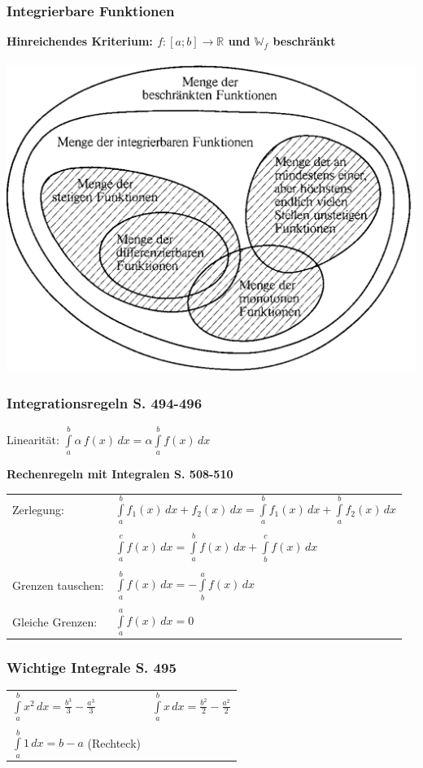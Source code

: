 	
		
		\subsubsection{Integrierbare Funktionen}
		\textbf{Hinreichendes Kriterium: $f: [a;b] \rightarrow \mathbb{R}$ und $\mathbb{W}_f$ beschränkt}		 \\
		\\	
		\includegraphics[width=0.7\linewidth]{Bilder/integrierbare-funktionen}
		
		
		\subsubsection{Integrationsregeln S. 494-496}
		Linearität: $\int \limits_{a}^{b} \alpha \, f(x) \, dx = \alpha \int \limits_{a}^{b} f(x)\, dx$ 
		
		
		\textbf{Rechenregeln mit Integralen S. 508-510}\\
		\begin{tabular}{ll}
		Zerlegung: & $\int \limits_{a}^{b} f_1(x) \, dx + f_2(x)\, dx = \int \limits_{a}^{b} f_1(x) \, dx + \int \limits_{a}^{b} f_2(x) \, dx$ \\
		\\		
		& $\int \limits_{a}^{c} f(x)\, dx = \int \limits_{a}^{b} f(x)\, dx + \int \limits_{b}^{c} f(x) \, dx$ \\
		\\
		Grenzen tauschen: & $ \int \limits_{a}^{b} f(x) \, dx = -  \int \limits_{b}^{a} f(x) \, dx $ \\
		\\
		Gleiche Grenzen: &  $\int \limits_{a}^{a} f(x) \, dx = 0$ \\
		\end{tabular}
		
		
		\subsubsection{Wichtige Integrale S. 495}
		\begin{tabular}{ll}
		$\int \limits_{a}^{b} x^2 \, dx = \frac{b^3}{3} - \frac{a^3}{3}$ & $\int \limits_{a}^{b} x \, dx = \frac{b^2}{2} - \frac{a^2}{2}$ \\
		\\
		$\int \limits_{a}^{b} 1 \, dx = b - a $ (Rechteck)& \\
		\end{tabular}
			
